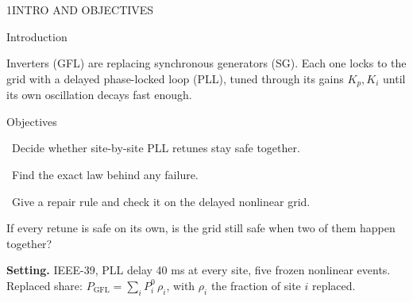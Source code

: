 \begin{minipage}[t][\PosterTopRowHeight][t]{\PosterOneWidth}\vspace{0pt}
  \begin{TicketTwoPanel}{\PosterTopRowHeight}{1}{INTRO AND OBJECTIVES}

    {\Subhead\color{IASDarkGreen}Introduction\par}\vspace{1mm}
    {\FigureSize Inverters (GFL) are replacing synchronous generators (SG). Each one locks to the grid with a delayed phase-locked loop (PLL), tuned through its gains $K_p,K_i$ until its own oscillation decays fast enough.\par}
    \vspace{3mm}
    {\Subhead\color{IASDarkGreen}Objectives\par}\vspace{1mm}
    {\FigureSize
    \ Decide whether site-by-site PLL retunes stay safe together.\par\vspace{1.5mm}
    \ Find the exact law behind any failure.\par\vspace{1.5mm}
    \ Give a repair rule and check it on the delayed nonlinear grid.\par}
    \vspace{3mm}
    \begin{InWords}\InWordsLabel If every retune is safe on its own, is the grid still safe when two of them happen together?\end{InWords}
    \vspace{3mm}
    {\FigureSize \textbf{Setting.} IEEE-39, PLL delay 40 ms at every site, five frozen nonlinear events. Replaced share: $P_{\mathrm{GFL}}=\sum_i P_i^0\,\rho_i$, with $\rho_i$ the fraction of site $i$ replaced.\par}

  \end{TicketTwoPanel}
\end{minipage}%
